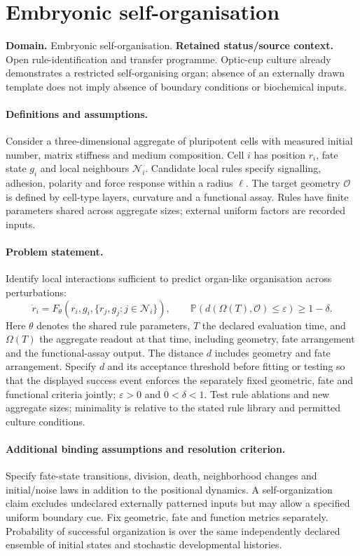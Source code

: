 \documentclass[11pt]{article}
\begin{document}
\section*{Embryonic self-organisation}
\label{prob:133}
\label{rank:86}
\par\smallskip

\noindent\textbf{Domain.} Embryonic self-organisation. \quad \textbf{Retained status/source context.} Open rule-identification and transfer programme. Optic-cup culture already demonstrates a restricted self-organising organ; absence of an externally drawn template does not imply absence of boundary conditions or biochemical inputs.
\paragraph{Definitions and assumptions.} Consider a three-dimensional aggregate of pluripotent cells with measured initial number, matrix stiffness and medium composition. Cell $i$ has position $r_i$, fate state $g_i$ and local neighbours $\mathcal N_i$. Candidate local rules specify signalling, adhesion, polarity and force response within a radius $\ell$. The target geometry $\mathcal O$ is defined by cell-type layers, curvature and a functional assay. Rules have finite parameters shared across aggregate sizes; external uniform factors are recorded inputs.
\paragraph{Problem statement.} Identify local interactions sufficient to predict organ-like organisation across perturbations:
\[
\dot r_i=F_\theta(r_i,g_i,\{r_j,g_j:j\in\mathcal N_i\}),
\qquad
\mathbb{P}(d(\Omega(T),\mathcal O)\leq\varepsilon)\geq1-\delta.
\]
Here $\theta$ denotes the shared rule parameters, $T$ the declared evaluation time, and $\Omega(T)$ the aggregate readout at that time, including geometry, fate arrangement and the functional-assay output. The distance $d$ includes geometry and fate arrangement. Specify $d$ and its acceptance threshold before fitting or testing so that the displayed success event enforces the separately fixed geometric, fate and functional criteria jointly; $\varepsilon>0$ and $0<\delta<1$. Test rule ablations and new aggregate sizes; minimality is relative to the stated rule library and permitted culture conditions.
\paragraph{Additional binding assumptions and resolution criterion.} Specify fate-state transitions, division, death, neighborhood changes and initial/noise laws in addition to the positional dynamics. A self-organization claim excludes undeclared externally patterned inputs but may allow a specified uniform boundary cue. Fix geometric, fate and function metrics separately. Probability of successful organization is over the same independently declared ensemble of initial states and stochastic developmental histories.
\end{document}
